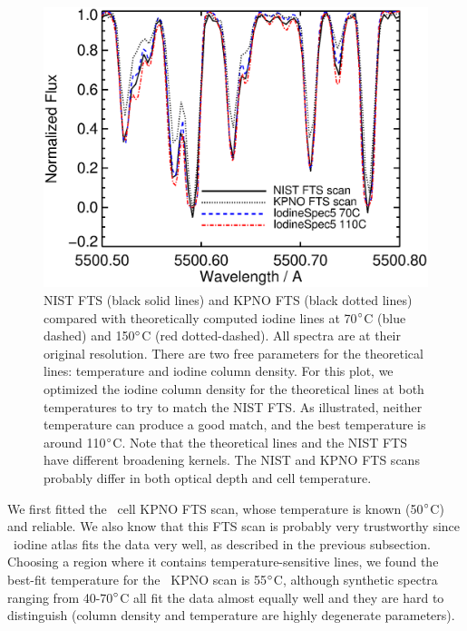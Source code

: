 \begin{figure}
\centering
\includegraphics[scale=0.5]{het/HET_NIST_temp.eps}
\caption{NIST FTS (black solid lines) and KPNO FTS (black dotted
lines) compared with theoretically computed iodine lines at
70$^{\circ}$C (blue dashed) and 150$^{\circ}$C (red dotted-dashed). All
spectra are at their original resolution. There are two free
parameters for the theoretical lines: temperature and iodine column
density. For this plot, we optimized the iodine column density for the
theoretical lines at both temperatures to try to match the NIST FTS. As
illustrated, neither temperature can produce a good match, and the
best temperature is around 110$^{\circ}$C. Note that the
theoretical lines and the NIST FTS have different broadening
kernels. The NIST and KPNO FTS scans probably differ in both optical
depth and cell temperature.
\label{het:fig:nisteyeball}}
\end{figure}

We first fitted the \keck\ cell KPNO FTS scan, whose temperature is
known (50$^{\circ}$C) and reliable. We also know that this FTS scan is
probably very trustworthy since \keck\ iodine atlas fits the data
very well, as described in the previous subsection. Choosing a region
where it contains temperature-sensitive lines, we found the best-fit
temperature for the \keck\ KPNO scan is 55$^{\circ}$C, although
synthetic spectra ranging from 40-70$^{\circ}$C all fit the data
almost equally well and they are hard to distinguish (column density
and temperature are highly degenerate parameters). 

